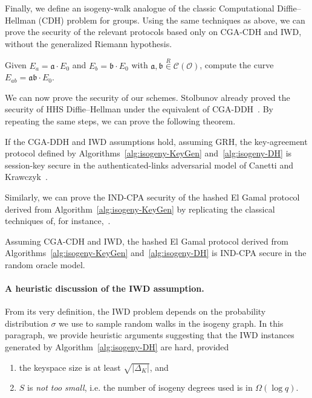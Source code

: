\documentclass{llncs}
\newcommand{\Cl}{\mathcal{C}}
\renewcommand{\O}{\mathcal{O}}
\renewcommand{\frak}{\mathfrak}
\newcommand{\rand}[1]{\overset{#1}{∈}}
\newcommand{\uni}{\rand{R}}
\begin{document}
Finally, we define an isogeny-walk analogue of the classic 
Computational Diffie--Hellman (CDH) problem for groups.
Using the same techniques as above, we can prove the
security of the relevant protocols based only on CGA-CDH and IWD,
without the generalized Riemann hypothesis.

\begin{definition}
    Given $E_a=\frak a·E_0$ and $E_b=\frak b·E_0$ 
    with $\frak a,\frak b\uni\Cl(\O)$, 
    compute the curve $E_{ab}=\frak{ab}·E_0$.
\end{definition}

We can now prove the security of our schemes. Stolbunov already proved
the security of HHS Diffie--Hellman under the equivalent of CGA-DDH~\cite{Stol}.
By repeating the same steps, we can prove the following theorem.

\begin{theorem}
    If the CGA-DDH and IWD assumptions hold, assuming GRH, 
    the key-agreement protocol defined by 
    Algorithms~\ref{alg:isogeny-KeyGen} and~\ref{alg:isogeny-DH}
    is session-key secure in the authenticated-links adversarial model 
    of Canetti and Krawczyk~\cite{canetti}.
\end{theorem}

Similarly, we can prove the IND-CPA security of the hashed El Gamal
protocol derived from Algorithm~\ref{alg:isogeny-KeyGen} by replicating the
classical techniques of, for
instance,~\cite[20.4.11]{galbraith2012mathematics}.

\begin{theorem}
    Assuming CGA-CDH and IWD, the hashed El Gamal protocol derived from
    Algorithms~\ref{alg:isogeny-KeyGen} and~\ref{alg:isogeny-DH}
    is IND-CPA secure in the random oracle model.
\end{theorem}


\paragraph{A heuristic discussion of the IWD assumption.}

From its very definition, the IWD problem depends on
the probability distribution $σ$ we use to sample
random walks in the isogeny graph. In this paragraph,
we provide heuristic arguments suggesting that 
the IWD instances generated by Algorithm~\ref{alg:isogeny-DH} are hard,
provided
\begin{enumerate}
    \item the keyspace size is at least $\sqrt{|Δ_K|}$, and
    \item $S$ is \emph{not too small}, i.e. the number of
        isogeny degrees used is in $\Omega(\log q)$.
\end{enumerate}
\end{document}
